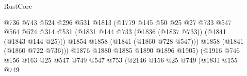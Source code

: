 \begin{lexlean}{RustCore}
\begin{coremodule}
                                              @736
                                              @743
                                              @524
                                              @296
                                              @531
                                              @1813
                                              (@1779
                                                @145
                                                @50
                                                @25
                                                @27
                                                @733
                                                @547
                                                @564
                                                @524
                                                @314
                                                @531
                                                (@1831
                                                  @144
                                                  @733
                                                  (@1836 (@1837 @733))
                                                  (@1841 (@1843 @144 @25)))
                                                @1854
                                                @1858
                                                (@1841 (@1860 @728 @547)))
                                              @1858
                                              (@1841 (@1860 @722 @736)))
                                            @1876
                                            @1880
                                            @1885
                                            @1890
                                            @1896
                                            @1905)
                                          (@1916
                                            @746
                                            @156
                                            @163
                                            @25
                                            @547
                                            @749
                                            @547
                                            @753
                                            (@2146
                                              @156
                                              @25
                                              @749
                                              (@1831
                                                @155
                                                @749

\end{coremodule}
\end{lexlean}
